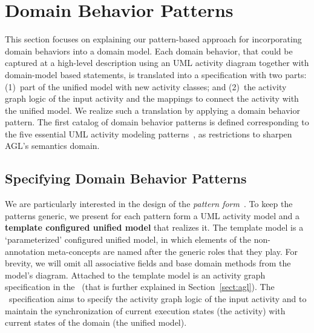 {%

\section{Domain Behavior Patterns}
\label{sect:behaviorPatterns}

This section focuses on explaining our pattern-based approach for incorporating domain behaviors into a domain model. Each domain behavior, that could be captured at a high-level description using an UML activity diagram together with domain-model based statements, is translated into a specification with two parts: (1)~part of the unified model with new activity classes; and (2)~the activity graph logic of the input activity and the mappings to connect the activity with the unified model. We realize such a translation by applying a domain behavior pattern. The first catalog of domain behavior patterns is defined corresponding to the five essential UML activity modeling patterns~\cite{le_domain_2018}, as restrictions to sharpen AGL's semantics domain.

\subsection{Specifying Domain Behavior Patterns}

We are particularly interested in the design of the \textit{pattern form}~\cite{riehle_understanding_1996, gamma_design_1994}. To keep the patterns generic, we present for each pattern form a UML activity model and a \textbf{template configured unified model} that realizes it. The template model is a `parameterized' configured unified model, in which elements of the non-annotation meta-concepts are named after the generic roles that they play. 
%
For brevity, we will omit all associative fields and base domain methods from the model's diagram. 
%
Attached to the template model is an activity graph specification in the \agl~(that is further explained in Section~\ref{sect:agl}). The \agl~specification aims to specify the activity graph logic of the input activity and to maintain the synchronization of current execution states (\wrt the activity) with current states of the domain (\wrt the unified model).

}
